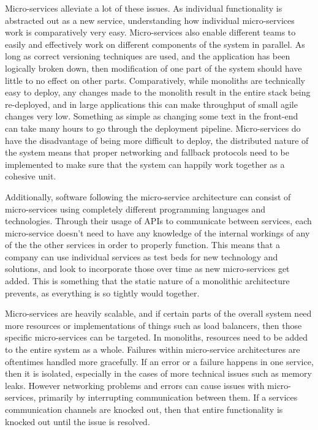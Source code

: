 Micro-services alleviate a lot of these issues. As individual functionality is abstracted out as a new service, understanding how individual micro-services work is comparatively very easy. Micro-services also enable different teams to easily and effectively work on different components of the system in parallel. As long as correct versioning techniques are used, and the application has been logically broken down, then modification of one part of the system should have little to no effect on other parts. Comparatively, while monoliths are technically easy to deploy, any changes made to the monolith result in the entire stack being re-deployed, and in large applications this can make throughput of small agile changes very low. Something as simple as changing some text in the front-end can take many hours to go through the deployment pipeline. Micro-services do have the disadvantage of being more difficult to deploy, the distributed nature of the system means that proper networking and fallback protocols need to be implemented to make sure that the system can happily work together as a cohesive unit.

Additionally, software following the micro-service architecture can consist of micro-services using completely different programming languages and technologies. Through their usage of APIs to communicate between services, each micro-service doesn't need to have any knowledge of the internal workings of any of the the other services in order to properly function. This means that a company can use individual services as test beds for new technology and solutions, and look to incorporate those over time as new micro-services get added. This is something that the static nature of a monolithic architecture prevents, as everything is so tightly would together.

Micro-services are heavily scalable, and if certain parts of the overall system need more resources or implementations of things such as load balancers, then those specific micro-services can be targeted. In monoliths, resources need to be added to the entire system as a whole. Failures within micro-service architectures are oftentimes handled more gracefully. If an error or a failure happens in one service, then it is isolated, especially in the cases of more technical issues such as memory leaks. However networking problems and errors can cause issues with micro-services, primarily by interrupting communication between them. If a services communication channels are knocked out, then that entire functionality is knocked out until the issue is resolved.

